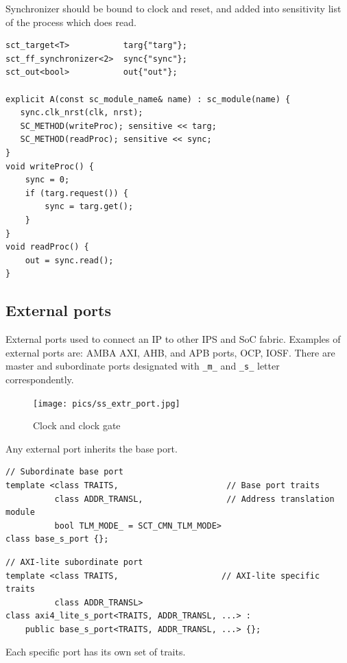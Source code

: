 Synchronizer should be bound to clock and reset, and added into sensitivity list of the process which does read.

\begin{lstlisting}[style=mycpp]
sct_target<T>           targ{"targ"};
sct_ff_synchronizer<2>  sync{"sync"};
sct_out<bool>           out{"out"};

explicit A(const sc_module_name& name) : sc_module(name) {
   sync.clk_nrst(clk, nrst);
   SC_METHOD(writeProc); sensitive << targ;
   SC_METHOD(readProc); sensitive << sync;
}
void writeProc() {
    sync = 0;
    if (targ.request()) {
        sync = targ.get();
    }
}
void readProc() {
    out = sync.read();
}
\end{lstlisting}

\subsection{External ports}

External ports used to connect an IP to other IPS and SoC fabric. Examples of external ports are: AMBA AXI, AHB, and APB ports, OCP, IOSF. There are master and subordinate ports designated with {\tt \_m\_} and {\tt \_s\_} letter correspondently.

\begin{figure}[!htb]
\centering
\texttt{[image: pics/ss\_extr\_port.jpg]}
\caption{Clock and clock gate}
\label{fig:ss_extr_port}
\end{figure}

Any external port inherits the base port.

\begin{lstlisting}[style=mycpp]
// Subordinate base port
template <class TRAITS,                      // Base port traits
          class ADDR_TRANSL,                 // Address translation module 
          bool TLM_MODE_ = SCT_CMN_TLM_MODE>  
class base_s_port {};
\end{lstlisting}

\begin{lstlisting}[style=mycpp]
// AXI-lite subordinate port
template <class TRAITS,                     // AXI-lite specific traits
          class ADDR_TRANSL>
class axi4_lite_s_port<TRAITS, ADDR_TRANSL, ...> :
    public base_s_port<TRAITS, ADDR_TRANSL, ...> {};
\end{lstlisting}

Each specific port has its own set of traits.


